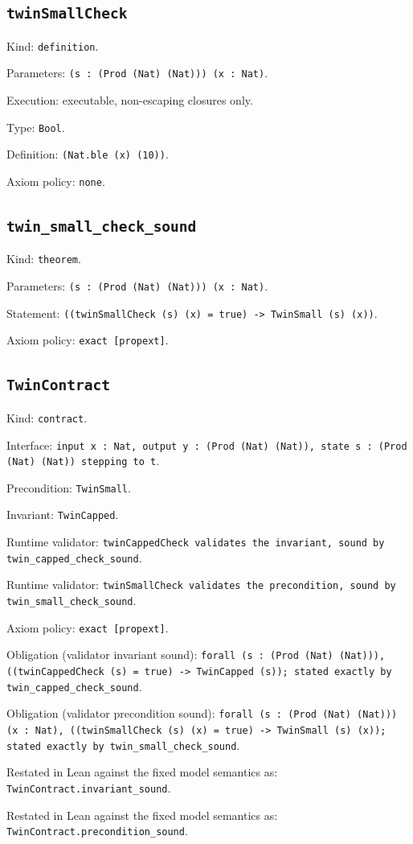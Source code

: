 \documentclass[11pt]{article}
\begin{document}
\subsection*{\texttt{twinSmallCheck}}
\noindent Kind: \texttt{definition}.\par
\noindent Parameters: \texttt{(s : (Prod (Nat) (Nat))) (x : Nat)}.\par
\noindent Execution: executable, non-escaping closures only.\par
\noindent Type: \texttt{Bool}.\par
\noindent Definition: \texttt{(Nat.ble (x) (10))}.\par
\noindent Axiom policy: \texttt{none}.\par
\subsection*{\texttt{twin\_small\_check\_sound}}
\noindent Kind: \texttt{theorem}.\par
\noindent Parameters: \texttt{(s : (Prod (Nat) (Nat))) (x : Nat)}.\par
\noindent Statement: \texttt{((twinSmallCheck (s) (x) = true) -> TwinSmall (s) (x))}.\par
\noindent Axiom policy: \texttt{exact [propext]}.\par
\subsection*{\texttt{TwinContract}}
\noindent Kind: \texttt{contract}.\par
\noindent Interface: \texttt{input x : Nat, output y : (Prod (Nat) (Nat)), state s : (Prod (Nat) (Nat)) stepping to t}.\par
\noindent Precondition: \texttt{TwinSmall}.\par
\noindent Invariant: \texttt{TwinCapped}.\par
\noindent Runtime validator: \texttt{twinCappedCheck validates the invariant, sound by twin\_capped\_check\_sound}.\par
\noindent Runtime validator: \texttt{twinSmallCheck validates the precondition, sound by twin\_small\_check\_sound}.\par
\noindent Axiom policy: \texttt{exact [propext]}.\par
\noindent Obligation (validator invariant sound): \texttt{forall (s : (Prod (Nat) (Nat))), ((twinCappedCheck (s) = true) -> TwinCapped (s)); stated exactly by twin\_capped\_check\_sound}.\par
\noindent Obligation (validator precondition sound): \texttt{forall (s : (Prod (Nat) (Nat))) (x : Nat), ((twinSmallCheck (s) (x) = true) -> TwinSmall (s) (x)); stated exactly by twin\_small\_check\_sound}.\par
\noindent Restated in Lean against the fixed model semantics as: \texttt{TwinContract.invariant\_sound}.\par
\noindent Restated in Lean against the fixed model semantics as: \texttt{TwinContract.precondition\_sound}.\par
\end{document}
